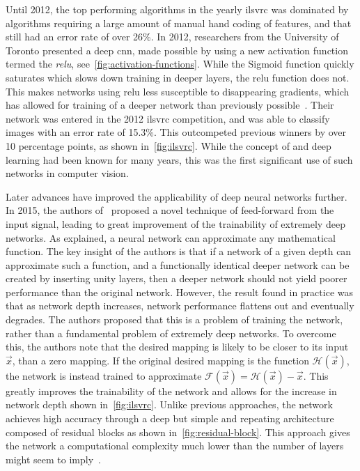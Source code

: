 \documentclass[\rootfolder/main.tex]{subfiles}
\begin{document}
Until 2012, the top performing algorithms in the yearly \acrfull{ilsvrc} was dominated by algorithms requiring a large amount of manual hand coding of features, and that still had an error rate of over 26\%.
In 2012, researchers from the University of Toronto presented a deep \acrshort{cnn}, made possible by using a new activation function termed the \emph{\acrfull{relu}}, see~\cref{fig:activation-functions}.
While the Sigmoid function quickly saturates which slows down training in deeper layers, the \acrshort{relu} function does not.
This makes networks using \acrshort{relu} less susceptible to disappearing gradients, which has allowed for training of a deeper network than previously possible~\cite{Krizhevsky2012}.
Their network was entered in the 2012 \acrshort{ilsvrc} competition, and was able to classify images with an error rate of 15.3\%.
This outcompeted previous winners by over 10 percentage points, as shown in~\cref{fig:ilsvrc}.
While the concept of  and deep learning had been known for many years, this was the first significant use of such networks in computer vision.

Later advances have improved the applicability of deep neural networks further.
In 2015, the authors of~\cite{He2016} proposed a novel technique of feed-forward from the input signal, leading to great improvement of the trainability of extremely deep networks.
As explained, a neural network can approximate any mathematical function.
The key insight of the authors is that if a network of a given depth can approximate such a function, and a functionally identical deeper network can be created by inserting unity layers, then a deeper network should not yield poorer performance than the original network.
However, the result found in practice was that as network depth increases, network performance flattens out and eventually degrades.
The authors proposed that this is a problem of training the network, rather than a fundamental problem of extremely deep networks.
To overcome this, the authors note that the desired mapping is likely to be closer to its input $\vec{x}$, than a zero mapping.
If the original desired mapping is the function $\mathcal{H}(\vec{x})$, the network is instead trained to approximate $\mathcal{F}(\vec{x}) = \mathcal{H}(\vec{x}) - \vec{x}$.
This greatly improves the trainability of the network and allows for the increase in network depth shown in~\cref{fig:ilsvrc}.
Unlike previous approaches, the network achieves high accuracy through a deep but simple and repeating architecture composed of residual blocks as shown in~\cref{fig:residual-block}.
This approach gives the network a computational complexity much lower than the number of layers might seem to imply~\cite{He2016}.
\end{document}
